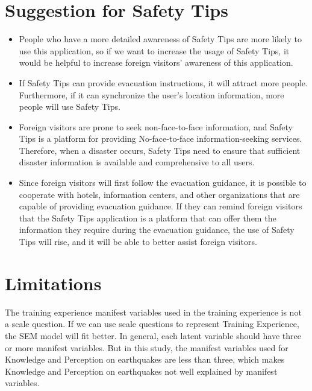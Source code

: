 \section{Suggestion for Safety Tips}
\begin{itemize}
\item People who have a more detailed awareness of Safety Tips are more likely to use this application, so if we want to increase the usage of Safety Tips, it would be helpful to increase foreign visitors' awareness of this application.
\item If Safety Tips can provide evacuation instructions, it will attract more people. Furthermore, if it can synchronize the user's location information, more people will use Safety Tips.
\item Foreign visitors are prone to seek non-face-to-face information, and Safety Tips is a platform for providing No-face-to-face information-seeking services. Therefore, when a disaster occurs, Safety Tips need to ensure that sufficient disaster information is available and comprehensive to all users.
\item Since foreign visitors will first follow the evacuation guidance, it is possible to cooperate with hotels, information centers, and other organizations that are capable of providing evacuation guidance. If they can remind foreign visitors that the Safety Tips application is a platform that can offer them the information they require during the evacuation guidance, the use of Safety Tips will rise, and it will be able to better assist foreign visitors.
\end{itemize}

\section{Limitations}
The training experience manifest variables used in the training experience is not a scale question. If we can use scale questions to represent Training Experience, the SEM model will fit better. In general, each latent variable should have three or more manifest variables. But in this study, the manifest variables used for Knowledge and Perception on earthquakes are less than three, which makes Knowledge and Perception on earthquakes not well explained by manifest variables. 


















